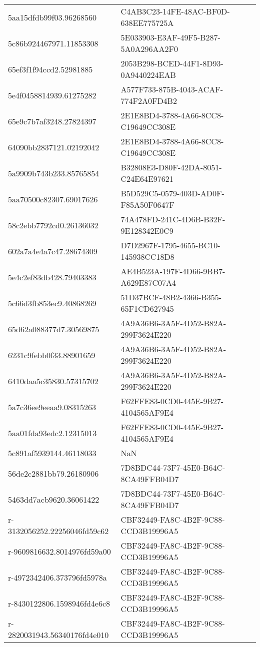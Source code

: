 \begin{tabular}{ll}
5aa15dfdb99f03.96268560 & C4AB3C23-14FE-48AC-BF0D-638EE775725A \\
5c86b924467971.11853308 & 5E033903-E3AF-49F5-B287-5A0A296AA2F0 \\
65ef3f1f94ccd2.52981885 & 2053B298-BCED-44F1-8D93-0A9440224EAB \\
5e4f0458814939.61275282 & A577F733-875B-4043-ACAF-774F2A0FD4B2 \\
65e9c7b7af3248.27824397 & 2E1E8BD4-3788-4A66-8CC8-C19649CC308E \\
64090bb2837121.02192042 & 2E1E8BD4-3788-4A66-8CC8-C19649CC308E \\
5a9909b743b233.85765854 & B32808E3-D80F-42DA-8051-C24E64E97621 \\
5aa70500c82307.69017626 & B5D529C5-0579-403D-AD0F-F85A50F0647F \\
58c2ebb7792cd0.26136032 & 74A478FD-241C-4D6B-B32F-9E128342E0C9 \\
602a7a4e4a7c47.28674309 & D7D2967F-1795-4655-BC10-145938CC18D8 \\
5e4c2ef83db428.79403383 & AE4B523A-197F-4D66-9BB7-A629E87C07A4 \\
5c66d3fb853ec9.40868269 & 51D37BCF-48B2-4366-B355-65F1CD627945 \\
65d62a088377d7.30569875 & 4A9A36B6-3A5F-4D52-B82A-299F3624E220 \\
6231c9febb0f33.88901659 & 4A9A36B6-3A5F-4D52-B82A-299F3624E220 \\
6410daa5c35830.57315702 & 4A9A36B6-3A5F-4D52-B82A-299F3624E220 \\
5a7c36ee9eeaa9.08315263 & F62FFE83-0CD0-445E-9B27-4104565AF9E4 \\
5aa01fda93edc2.12315013 & F62FFE83-0CD0-445E-9B27-4104565AF9E4 \\
5c891af5939144.46118033 & NaN \\
56de2c2881bb79.26180906 & 7D8BDC44-73F7-45E0-B64C-8CA49FFB04D7 \\
5463dd7acb9620.36061422 & 7D8BDC44-73F7-45E0-B64C-8CA49FFB04D7 \\
r-3132056252.22256046fd59c62 & CBF32449-FA8C-4B2F-9C88-CCD3B19996A5 \\
r-9609816632.8014976fd59a00 & CBF32449-FA8C-4B2F-9C88-CCD3B19996A5 \\
r-4972342406.373796fd5978a & CBF32449-FA8C-4B2F-9C88-CCD3B19996A5 \\
r-8430122806.1598946fd4e6c8 & CBF32449-FA8C-4B2F-9C88-CCD3B19996A5 \\
r-2820031943.56340176fd4e010 & CBF32449-FA8C-4B2F-9C88-CCD3B19996A5 \\

\end{tabular}
